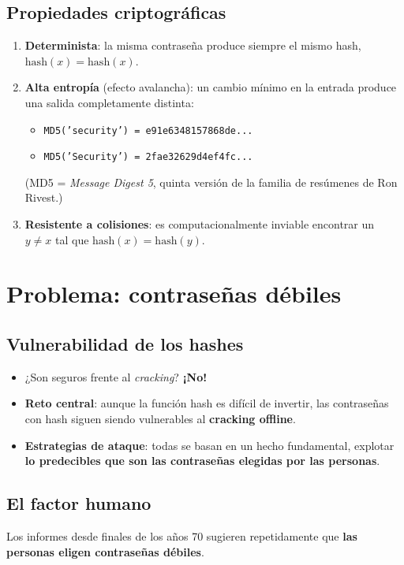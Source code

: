 \documentclass[11pt,a4paper]{report}
\newcommand{\destacar}[1]{\textcolor{red!70!black}{\textbf{#1}}}
\begin{document}
\subsection{Propiedades criptográficas}
\begin{enumerate}[label=\textbf{0\arabic*.}]
  \item \textbf{Determinista}: la misma contraseña produce siempre el mismo hash, $\mathrm{hash}(x) = \mathrm{hash}(x)$.
  \item \textbf{Alta entropía} (efecto avalancha): un cambio mínimo en la entrada produce una salida completamente distinta:
    \begin{itemize}
      \item \texttt{MD5('security') = e91e6348157868de...}
      \item \texttt{MD5('Security') = 2fae32629d4ef4fc...}
    \end{itemize}
    (MD5 = \emph{Message Digest 5}, quinta versión de la familia de resúmenes de Ron Rivest.)
  \item \textbf{Resistente a colisiones}: es computacionalmente inviable encontrar un $y \neq x$ tal que $\mathrm{hash}(x) = \mathrm{hash}(y)$.
\end{enumerate}
 
\section{Problema: contraseñas débiles}
 
\subsection{Vulnerabilidad de los hashes}
\begin{itemize}
  \item ¿Son seguros frente al \emph{cracking}? \destacar{¡No!}
  \item \textbf{Reto central}: aunque la función hash es difícil de invertir, las contraseñas con hash siguen siendo vulnerables al \textbf{cracking offline}.
  \item \textbf{Estrategias de ataque}: todas se basan en un hecho fundamental, explotar \textbf{lo predecibles que son las contraseñas elegidas por las personas}.
\end{itemize}
 
\subsection{El factor humano}
Los informes desde finales de los años 70 sugieren repetidamente que \textbf{las personas eligen contraseñas débiles}.
 
\end{document}
